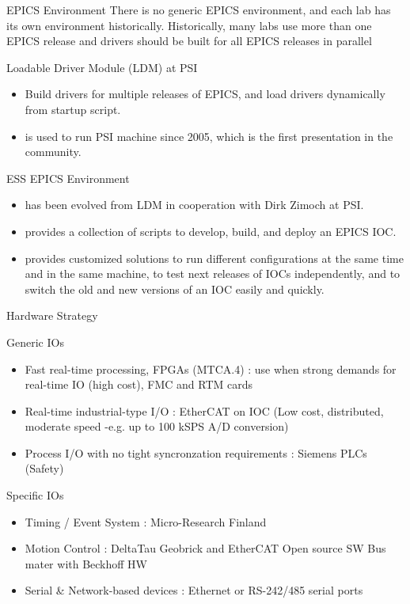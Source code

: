 \documentclass[
  9pt
  , table
  , ignorenonframetext
]{beamer}
\begin{document}
\begin{frame}{EPICS Environment}
  There is no generic EPICS environment, and each lab has its own environment historically. Historically, many labs use more than one EPICS release and drivers should be built for all EPICS releases in parallel
  \begin{block}{Loadable Driver Module (LDM) at PSI}
    \begin{itemize}
    \item Build drivers for multiple releases of EPICS, and load drivers dynamically from startup script.
    \item is used to run PSI machine since 2005, which is the first presentation in the community.
    \end{itemize}
  \end{block}

  \begin{exampleblock}{ESS EPICS Environment}
    \begin{itemize}
    \item has been evolved from LDM in cooperation with Dirk Zimoch at PSI.
    \item provides a collection of scripts to develop, build, and deploy an EPICS IOC.
    \item provides customized solutions to run different configurations at the same time and in the same machine, to test next releases of IOCs independently, and to switch the old and new versions of an IOC easily and quickly.
    \end{itemize}
  \end{exampleblock}
\end{frame}

\begin{frame}{Hardware Strategy}
  \begin{block}{Generic IOs}
    \begin{itemize}
    \item Fast real-time processing, FPGAs (MTCA.4) : use when strong demands for real-time IO (high cost), FMC and RTM cards
    \item Real-time industrial-type I/O : EtherCAT on IOC (Low cost, distributed, moderate speed -e.g. up to 100 kSPS A/D conversion)
    \item Process I/O with no tight syncronzation requirements : Siemens PLCs (Safety)
    \end{itemize}
  \end{block}
 \begin{exampleblock}{Specific IOs}
    \begin{itemize}
    \item Timing / Event System : Micro-Research Finland 
    \item Motion Control :  DeltaTau Geobrick and EtherCAT Open source SW Bus mater with Beckhoff HW
    \item Serial \& Network-based devices : Ethernet or RS-242/485 serial ports 
    \end{itemize}
  \end{exampleblock}
  
\end{frame}
\end{document}
